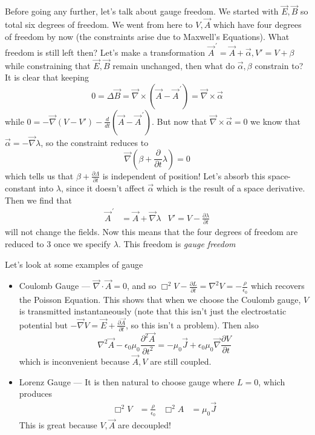 \documentclass[10pt]{report}
\newcommand{\rd}[2]{\frac{d#1}{d#2}}
\newcommand{\pd}[2]{\frac{\partial #1}{\partial#2}}
\newcommand{\ptd}[2]{\frac{\partial^2 #1}{\partial#2^2}}
\newcommand{\pvec}[1]{\vec{#1}^{\,\prime}}
\begin{document}
Before going any further, let's talk about gauge freedom. We started with $\vec{E}, \vec{B}$ so total six degrees of freedom. We went from here to $V,\vec{A}$ which have four degrees of freedom by now (the constraints arise due to Maxwell's Equations). What freedom is still left then? Let's make a transformation $\pvec{A} = \vec{A} + \vec{\alpha}, V' = V + \beta$ while constraining that $\vec{E}, \vec{B}$ remain unchanged, then what do $\vec{\alpha}, \beta$ constrain to? It is clear that keeping \begin{equation}
    0 = \Delta \vec{B} = \vec{\nabla} \times \left( \vec{A} - \pvec{A} \right) = \vec{\nabla} \times \vec{\alpha}
\end{equation}
while $0 = -\vec{\nabla}\left( V - V' \right) - \rd{}{t}\left( \vec{A} - \pvec{A} \right)$. But now that $\vec{\nabla} \times \vec{\alpha} = 0$ we know that $\vec{\alpha} = -\vec{\nabla} \lambda$, so the constraint reduces to
\begin{equation}
    \vec{\nabla}\left( \beta + \pd{}{t}\lambda \right) = 0
\end{equation}
which tells us that $\beta + \pd{\Lambda}{t}$ is independent of position! Let's absorb this space-constant into $\lambda$, since it doesn't affect $\vec{\alpha}$ which is the result of a space derivative. Then we find that
\begin{align}
    \pvec{A} &= \vec{A} + \vec{\nabla} \lambda & V' = V - \pd{\lambda}{t}
\end{align}
will not change the fields. Now this means that the four degrees of freedom are reduced to $3$ once we specify $\lambda$. This freedom is \emph{gauge freedom}

Let's look at some examples of gauge
\begin{itemize}
    \item Coulomb Gauge --- $\vec{\nabla} \cdot \vec{A} = 0$, and so $\Box^2V - \pd{L}{t} = \nabla^2 V = -\frac{\rho}{\epsilon_0}$ which recovers the Poisson Equation. This shows that when we choose the Coulomb gauge, $V$ is transmitted instantaneously (note that this isn't just the electrostatic potential but $-\vec{\nabla}V = \vec{E} + \pd{\vec{A}}{t}$, so this isn't a problem). Then also 
        \begin{equation}
            \nabla^2 \vec{A} - \epsilon_0 \mu_0 \ptd{\vec{A}}{t} = -\mu_0 \vec{J} + \epsilon_0 \mu_0 \vec{\nabla}\pd{V}{t}
        \end{equation}
        which is inconvenient because $\vec{A}, V$ are still coupled.
    \item Lorenz Gauge --- It is then natural to choose gauge where $L=0$, which produces
        \begin{align}
            \Box^2 V &= \frac{\rho}{\epsilon_0} & \Box^2 A &= \mu_0 \vec{J}
        \end{align}
        This is great because $V,\vec{A}$ are decoupled!
\end{itemize} 
\end{document}

